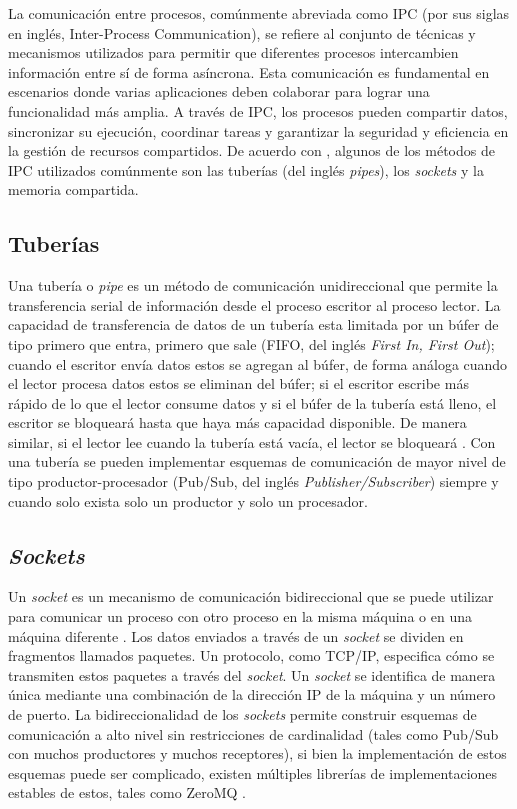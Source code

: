 La comunicación entre procesos, comúnmente abreviada como IPC (por sus siglas en inglés, Inter-Process Communication), se refiere al conjunto de técnicas y mecanismos utilizados para permitir que diferentes procesos intercambien información entre sí de forma asíncrona. Esta comunicación es fundamental en escenarios donde varias aplicaciones deben colaborar para lograr una funcionalidad más amplia. A través de IPC, los procesos pueden compartir datos, sincronizar su ejecución, coordinar tareas y garantizar la seguridad y eficiencia en la gestión de recursos compartidos. De acuerdo con \cite{IPCEval2015}, algunos de los métodos de IPC utilizados comúnmente son las tuberías (del inglés \textit{pipes}), los \textit{sockets} y la memoria compartida.

\subsection{Tuberías}

Una tubería o \textit{pipe} es un método de comunicación unidireccional que permite la transferencia serial de información desde el proceso escritor al proceso lector. La capacidad de transferencia de datos de un tubería esta limitada por un búfer de tipo primero que entra, primero que sale (FIFO, del inglés \textit{First In, First Out}); cuando el escritor envía datos estos se agregan al búfer, de forma análoga cuando el lector procesa datos estos se eliminan del búfer; si el escritor escribe más rápido de lo que el lector consume datos y si el búfer de la tubería está lleno, el escritor se bloqueará hasta que haya más capacidad disponible. De manera similar, si el lector lee cuando la tubería está vacía, el lector se bloqueará \cite{IPCEval2015}. Con una tubería se pueden implementar esquemas de comunicación de mayor nivel de tipo productor-procesador (Pub/Sub, del inglés \textit{Publisher/Subscriber}) siempre y cuando solo exista solo un productor y solo un procesador.

\subsection{\textit{Sockets}}

Un \textit{socket} es un mecanismo de comunicación bidireccional que se puede utilizar para comunicar un proceso con otro proceso en la misma máquina o en una máquina diferente \cite{IPCEval2015}. Los datos enviados a través de un \textit{socket} se dividen en fragmentos llamados paquetes. Un protocolo, como TCP/IP, especifica cómo se transmiten estos paquetes a través del \textit{socket}. Un \textit{socket} se identifica de manera única mediante una combinación de la dirección IP de la máquina y un número de puerto. La bidireccionalidad de los \textit{sockets} permite construir esquemas de comunicación a alto nivel sin restricciones de cardinalidad (tales como Pub/Sub con muchos productores y muchos receptores), si bien la implementación de estos esquemas puede ser complicado,  existen múltiples librerías de implementaciones estables de estos, tales como ZeroMQ \cite{zeroMQ}.

